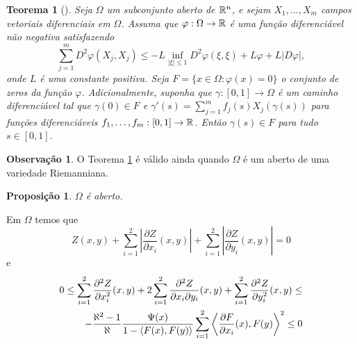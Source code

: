 \documentclass[12pt,a4paper]{beamer}
\newtheorem{teorema}{Teorema}
\newtheorem{proposicao}{Proposição}
\theoremstyle{definition}
\newtheorem{observacao}{Observação}
\begin{document}
\begin{frame}
	\begin{teorema}[\cite{Brendle2010}]
		\label{bony's-strict-maximum-principe}
		Seja $\Omega$ um subconjunto aberto de $\mathbb R^n$, e sejam $X_1, \ldots, X_m$ campos vetoriais diferenciais em $\Omega$. Assuma que $\varphi: \Omega \rightarrow \mathbb R$ é uma função diferenciável não negativa satisfazendo
		\begin{equation*}
			\sum_{j=1}^{m} D^2 \varphi (X_j,X_j) \leq -L \inf_{|\xi| \leq 1} D^2 \varphi(\xi,\xi) + L \varphi + L |D \varphi|,
		\end{equation*}
		onde $L$ é uma constante positiva. Seja $F= \{ x \in \Omega: \varphi(x)=0 \}$ o conjunto de zeros da função $\varphi$. Adicionalmente, suponha que $\gamma: [0,1] \rightarrow \Omega$ é um caminho diferenciável tal que $\gamma(0) \in F$ e $\gamma'(s) = \sum_{j=1}^{m} f_j(s) X_j(\gamma(s))$ para funções diferenciáveis $f_1, \ldots, f_m: [0,1] \rightarrow \mathbb R$. Então $\gamma(s) \in F$ para tudo $s \in [0,1]$.
	\end{teorema}
\end{frame}

\begin{frame}
	\begin{observacao}
		O Teorema \ref{bony's-strict-maximum-principe} é válido ainda quando $\Omega$ é um aberto de uma variedade Riemanniana. 
	\end{observacao}

		\begin{proposicao}
		$\Omega$ é aberto.
	\end{proposicao}
\end{frame}

\begin{frame}
	Em $\Omega$ temos que
	\begin{equation*}
		Z(x,y) + \sum_{i=1}^{2} \left| \frac{\partial Z}{\partial x_i}(x,y) \right| + \sum_{i=1}^{2} \left| \frac{\partial Z}{\partial y_i}(x,y) \right| = 0
	\end{equation*}
	e
	\begin{align*}
		0 \leq \sum_{i=1}^{2} \frac{\partial^2 Z}{\partial x_i^2}(x,y) + 2 \sum_{i=1}^{2} \frac{\partial^2 Z}{\partial x_i \partial y_i}(x,y) + \sum_{i=1}^{2} \frac{\partial^2 Z}{\partial y_i^2}(x,y) \leq \\
		- \frac{\aleph^2 -1}{\aleph} \frac{\Psi(x)}{1 - \left\langle F(x),F(y) \right\rangle} \sum_{i=1}^{2} \left\langle \frac{\partial F}{\partial x_i}(x),F(y) \right\rangle^2 \leq 0
	\end{align*}
\end{frame}
\end{document}
